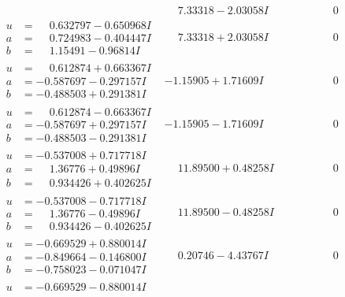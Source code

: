 \documentclass[1p]{elsarticle_modified}
\theoremstyle{definition}
\begin{document}
$$\begin{array}{c|c|c}
 & \phantom{-}7.33318 - 2.03058 I & \phantom{-0.000000 } 0 \\ \hline\begin{aligned}
u &= \phantom{-}0.632797 - 0.650968 I \\
a &= \phantom{-}0.724983 - 0.404447 I \\
b &= \phantom{-}1.15491 - 0.96814 I\end{aligned}
 & \phantom{-}7.33318 + 2.03058 I & \phantom{-0.000000 } 0 \\ \hline\begin{aligned}
u &= \phantom{-}0.612874 + 0.663367 I \\
a &= -0.587697 - 0.297157 I \\
b &= -0.488503 + 0.291381 I\end{aligned}
 & -1.15905 + 1.71609 I & \phantom{-0.000000 } 0 \\ \hline\begin{aligned}
u &= \phantom{-}0.612874 - 0.663367 I \\
a &= -0.587697 + 0.297157 I \\
b &= -0.488503 - 0.291381 I\end{aligned}
 & -1.15905 - 1.71609 I & \phantom{-0.000000 } 0 \\ \hline\begin{aligned}
u &= -0.537008 + 0.717718 I \\
a &= \phantom{-}1.36776 + 0.49896 I \\
b &= \phantom{-}0.934426 + 0.402625 I\end{aligned}
 & \phantom{-}11.89500 + 0.48258 I & \phantom{-0.000000 } 0 \\ \hline\begin{aligned}
u &= -0.537008 - 0.717718 I \\
a &= \phantom{-}1.36776 - 0.49896 I \\
b &= \phantom{-}0.934426 - 0.402625 I\end{aligned}
 & \phantom{-}11.89500 - 0.48258 I & \phantom{-0.000000 } 0 \\ \hline\begin{aligned}
u &= -0.669529 + 0.880014 I \\
a &= -0.849664 - 0.146800 I \\
b &= -0.758023 - 0.071047 I\end{aligned}
 & \phantom{-}0.20746 - 4.43767 I & \phantom{-0.000000 } 0 \\ \hline\begin{aligned}
u &= -0.669529 - 0.880014 I \\

\end{aligned}
\end{array}$$
\end{document}
